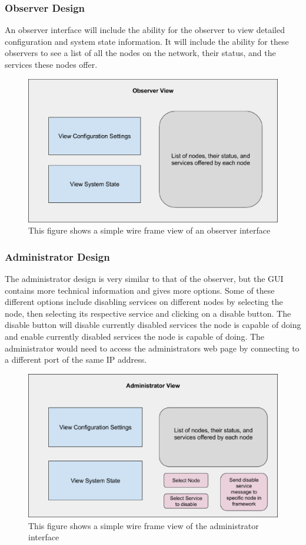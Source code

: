 \documentclass[draftclsnofoot, onecolumn, compsoc, 10pt]{IEEEtran}
\begin{document}
\subsubsection{Observer Design}
An observer interface will include the ability for the observer to view detailed configuration and system state information. It will include the ability for these observers to see a list of all the nodes on the network, their status, and the services these nodes offer.
\begin{figure}
\centering
\includegraphics[scale=0.4]{observer}
\captionsetup{justification=centering}
\caption{This figure shows a simple wire frame view of an observer interface}
\end{figure}


\subsubsection{Administrator Design}
The administrator design is very similar to that of the observer, but the GUI contains more technical information and gives more options. Some of these different options include disabling services on different nodes by selecting the node, then selecting its respective service and clicking on a disable button. The disable button will disable currently disabled services the node is capable of doing and enable currently disabled services the node is capable of doing. 
The administrator would need to access the administrators web page by connecting to a different port of the same IP address.  
\begin{figure}[H]
\centering
\includegraphics[scale=0.4]{admin}
\captionsetup{justification=centering}
\caption{This figure shows a simple wire frame view of the administrator interface}
\end{figure}
\end{document}
